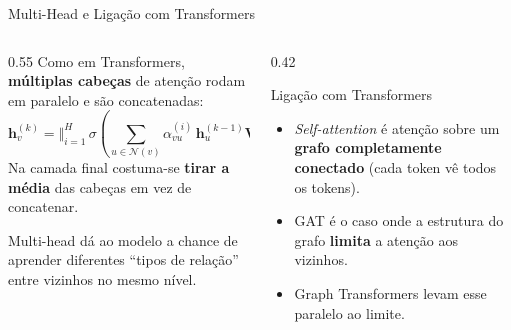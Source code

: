 \documentclass[aspectratio=169,xcolor=dvipsnames]{beamer}
\begin{document}
  \begin{frame}{Multi-Head e Ligação com Transformers}
    \begin{columns}[T]
      \begin{column}{0.55\textwidth}
        Como em Transformers, \textbf{múltiplas cabeças} de atenção rodam em paralelo e são concatenadas:
        \[
          \mathbf{h}^{(k)}_v = \big\Vert_{i=1}^{H}\, \sigma\!\left(
            \sum_{u \in \mathcal{N}(v)} \alpha^{(i)}_{vu}\, \mathbf{h}^{(k-1)}_u \mathbf{W}^{(i)\top}
          \right)
        \]
        Na camada final costuma-se \textbf{tirar a média} das cabeças em vez
        de concatenar.

        \vspace{0.4em}
        Multi-head dá ao modelo a chance de aprender diferentes \enquote{tipos de
        relação} entre vizinhos no mesmo nível.
      \end{column}
      \begin{column}{0.42\textwidth}
        \begin{block}{Ligação com Transformers}
          \begin{itemize}
            \item \textit{Self-attention} é atenção sobre um \textbf{grafo completamente conectado}
                  (cada token vê todos os tokens).
            \item GAT é o caso onde a estrutura do grafo \textbf{limita} a atenção
                  aos vizinhos.
            \item Graph Transformers levam esse paralelo ao limite.
          \end{itemize}
        \end{block}
      \end{column}
    \end{columns}
  \end{frame}
\end{document}
